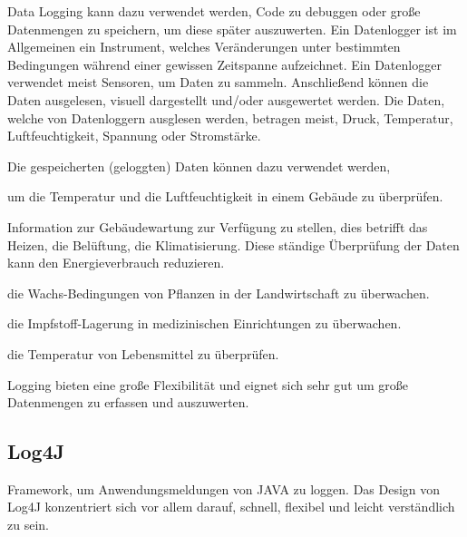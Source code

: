 
Data Logging kann dazu verwendet werden, Code zu debuggen oder große Datenmengen zu speichern, um diese später auszuwerten. Ein Datenlogger ist im Allgemeinen ein Instrument, welches Veränderungen unter bestimmten Bedingungen während einer gewissen Zeitspanne aufzeichnet. Ein Datenlogger verwendet meist Sensoren, um Daten zu sammeln. Anschließend können die Daten ausgelesen, visuell dargestellt und/oder ausgewertet werden. Die Daten, welche von Datenloggern ausglesen werden, betragen meist, Druck, Temperatur, Luftfeuchtigkeit, Spannung oder Stromstärke. \cite{DataLogging} 

Die gespeicherten (geloggten) Daten können dazu verwendet werden, 

\begin{compactitem}
    \item um die Temperatur und die Luftfeuchtigkeit in einem Gebäude zu überprüfen.
    \item Information zur Gebäudewartung zur Verfügung zu stellen, dies betrifft das Heizen, die Belüftung, die Klimatisierung. Diese ständige Überprüfung der Daten kann den Energieverbrauch reduzieren.
    \item die Wachs-Bedingungen von Pflanzen in der Landwirtschaft zu überwachen. 
    \item die Impfstoff-Lagerung in medizinischen Einrichtungen zu überwachen. 
    \item die Temperatur von Lebensmittel zu überprüfen.
\end{compactitem}
\cite{DataLogging}

Logging bieten eine große Flexibilität und eignet sich sehr gut um große Datenmengen zu erfassen und auszuwerten. \cite{BigDataBuch}

\subsection{Log4J}
Framework, um Anwendungsmeldungen von JAVA zu loggen.
Das Design von Log4J konzentriert sich vor allem darauf, schnell, flexibel und leicht verständlich zu sein. \cite{log4JBuch} 

